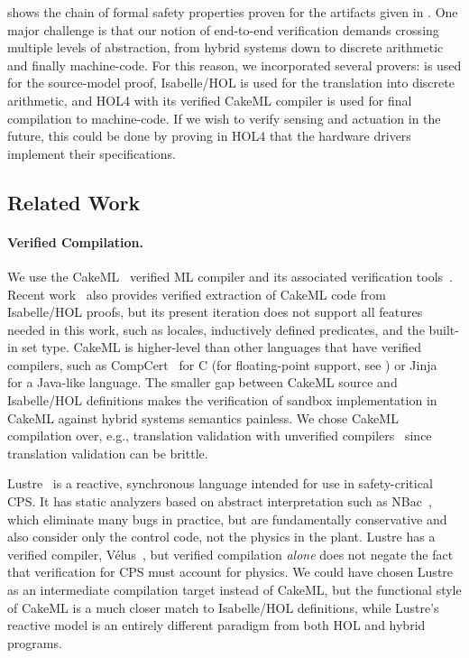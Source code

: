 \documentclass[12pt]{cmuthesis}
\theoremstyle{definition}
\theoremstyle{remark}
\newcommand{\rref}[2][]{\prettyref{#2}}
\newcommand{\Isabelle}{Isabelle/HOL\xspace}
\begin{document}
\rref{fig:proofchainoverview} shows the chain of formal safety properties proven for the artifacts given in \rref{fig:pipelineoverview}.
One major challenge is that our notion of end-to-end verification demands crossing multiple levels of abstraction, from hybrid systems down to discrete arithmetic and finally machine-code.
For this reason, we incorporated several provers: \KeYmaeraX is used for the source-model proof, Isabelle/HOL is used for the translation into discrete arithmetic, and HOL4 with its verified CakeML compiler is used for final compilation to machine-code.
If we wish to verify sensing and actuation in the future, this could be done by proving in HOL4 that the hardware drivers implement their specifications.

\subsection{Related Work}
\paragraph{Verified Compilation.}
We use the CakeML~\cite{DBLP:conf/icfp/TanMKFON16} verified ML compiler and its associated verification tools~\cite{DBLP:conf/icfp/MyreenO12,DBLP:conf/esop/GueneauMKN17}.
Recent work~\cite{DBLP:conf/esop/HupelN18} also provides verified extraction of CakeML code from \Isabelle proofs, but its present iteration does not support all features needed in this work, such as locales, inductively defined predicates, and the built-in set type.
CakeML is higher-level than other languages that have verified compilers, such as CompCert~\cite{Leroy:popl:2006}  for C (for floating-point support, see \cite{DBLP:conf/arith/BoldoJLM13}) or Jinja~\cite{DBLP:journals/toplas/KleinN06} for a Java-like language.
The smaller gap between CakeML source and Isabelle/HOL definitions makes the verification of sandbox implementation in CakeML against hybrid systems semantics painless.
We chose CakeML compilation over, e.g., translation validation with unverified compilers~\cite{DBLP:conf/pldi/SewellMK13} since translation validation can be brittle.

Lustre~\cite{DBLP:journals/tse/HalbwachsLR92} is a reactive, synchronous language intended for use in safety-critical CPS.
It has static analyzers based on abstract interpretation such as NBac~\cite{DBLP:journals/fmsd/Jeannet03}, which eliminate many bugs in practice, but are fundamentally conservative and also consider only the control code, not the physics in the plant.
Lustre has a verified compiler, V\'{e}lus~\cite{DBLP:conf/pldi/BourkeBDLPR17}, but verified compilation \emph{alone} does not negate the fact that verification for CPS must account for physics.
We could have chosen Lustre as an intermediate compilation target instead of CakeML, but the functional style of CakeML is a much closer match to Isabelle/HOL definitions, while Lustre's reactive model is an entirely different paradigm from both HOL and hybrid programs.
\end{document}
